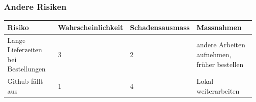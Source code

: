 \subsubsection{Andere Risiken}
\begin{table}[H]
\begin{tabular}{|p{}|p{}|p{}|p{}|}\hline
	
	\textbf{Risiko}	& 	\textbf{Wahrscheinlichkeit} & \textbf{Schadensausmass}  & \textbf{Massnahmen} \\\hline
	
	Lange Lieferzeiten bei Bestellungen	&	3	&	2	& andere Arbeiten aufnehmen, früher bestellen  \\\hline
	Github fällt aus	&	1	&	4	& Lokal weiterarbeiten  \\\hline
\end{tabular}\\
\end{table}

